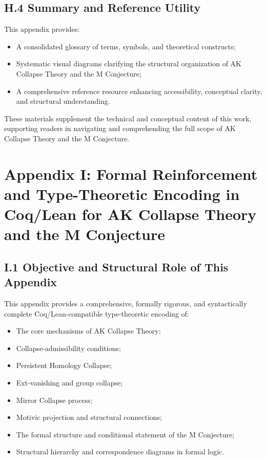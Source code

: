 \documentclass[11pt]{article}
\begin{document}
\subsection*{H.4 Summary and Reference Utility}

This appendix provides:

\begin{itemize}
    \item A consolidated glossary of terms, symbols, and theoretical constructs;
    \item Systematic visual diagrams clarifying the structural organization of AK Collapse Theory and the M Conjecture;
    \item A comprehensive reference resource enhancing accessibility, conceptual clarity, and structural understanding.
\end{itemize}

These materials supplement the technical and conceptual content of this work, supporting readers in navigating and comprehending the full scope of AK Collapse Theory and the M Conjecture.

\FloatBarrier




\section*{Appendix I: Formal Reinforcement and Type-Theoretic Encoding in Coq/Lean for AK Collapse Theory and the M Conjecture}

\subsection*{I.1 Objective and Structural Role of This Appendix}

This appendix provides a comprehensive, formally rigorous, and syntactically complete Coq/Lean-compatible type-theoretic encoding of:

\begin{itemize}
    \item The core mechanisms of AK Collapse Theory;
    \item Collapse-admissibility conditions;
    \item Persistent Homology Collapse;
    \item Ext-vanishing and group collapse;
    \item Mirror Collapse process;
    \item Motivic projection and structural connections;
    \item The formal structure and conditional statement of the M Conjecture;
    \item Structural hierarchy and correspondence diagrams in formal logic.
\end{itemize}
\end{document}

